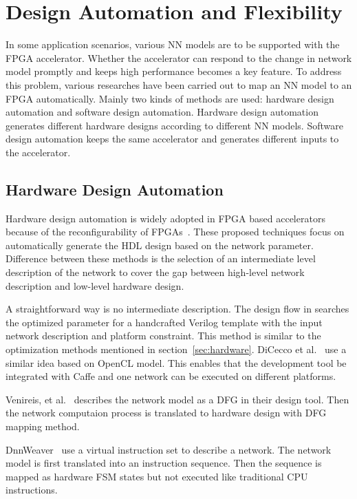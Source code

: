 \section{Design Automation and Flexibility}\label{sec:flexibility}

In some application scenarios, various NN models are to be supported with the FPGA accelerator. Whether the accelerator can respond to the change in network model promptly and keeps high performance becomes a key feature. To address this problem, various researches have been carried out to map an NN model to an FPGA automatically. Mainly two kinds of methods are used: hardware design automation and software design automation. Hardware design automation generates different hardware designs according to different NN models. Software design automation keeps the same accelerator and generates different inputs to the accelerator.

\subsection{Hardware Design Automation}
Hardware design automation is widely adopted in FPGA based accelerators because of the reconfigurability of FPGAs~\cite{venieris2017fpgaconvnet, morcel2017minimalist, ma2017automatic, venieris2017latency, dicecco2016caffeinated, wang2016deepburning, sharma2016high}. These proposed techniques focus on automatically generate the HDL design based on the network parameter. Difference between these methods is the selection of an intermediate level description of the network to cover the gap between high-level network description and low-level hardware design.

A straightforward way is no intermediate description. The design flow in \cite{ma2017automatic} searches the optimized parameter for a handcrafted Verilog template with the input network description and platform constraint. This method is similar to the optimization methods mentioned in section~\ref{sec:hardware}. DiCecco et al.~\cite{dicecco2016caffeinated} use a similar idea based on OpenCL model. This enables that the development tool be integrated with Caffe and one network can be executed on different platforms. 

Venireis, et al.~\cite{venieris2017latency} describes the network model as a DFG in their design tool. Then the network computaion process is translated to hardware design with DFG mapping method.

DnnWeaver~\cite{sharma2016high} use a virtual instruction set to describe a network. The network model is first translated into an instruction sequence. Then the sequence is mapped as hardware FSM states but not executed like traditional CPU instructions. 

